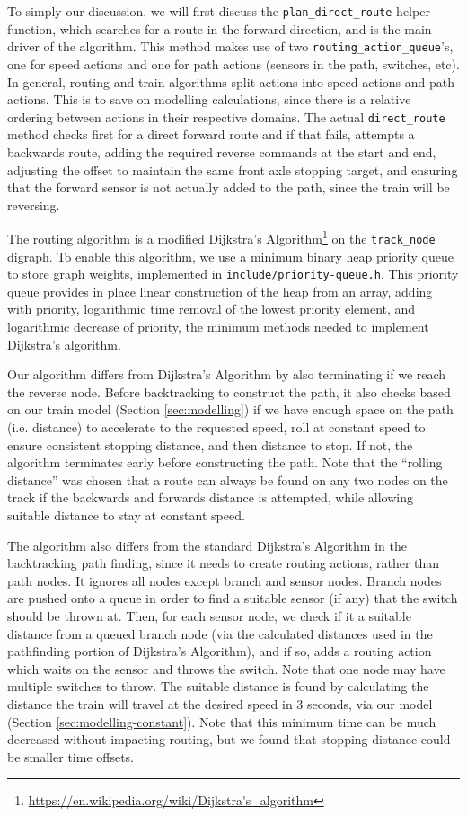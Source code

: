 \documentclass[12pt, titlepage]{article}
\begin{document}
    To simply our discussion, we will first discuss the \verb`plan_direct_route` helper function, which searches for a route in the forward direction, and is the main driver of the algorithm. This method makes use of two \verb`routing_action_queue`'s, one for speed actions and one for path actions (sensors in the path, switches, etc). In general, routing and train algorithms split actions into speed actions and path actions. This is to save on modelling calculations, since there is a relative ordering between actions in their respective domains. The actual \verb`direct_route` method checks first for a direct forward route and if that fails, attempts a backwards route, adding the required reverse commands at the start and end, adjusting the offset to maintain the same front axle stopping target, and ensuring that the forward sensor is not actually added to the path, since the train will be reversing.
    
    The routing algorithm is a modified Dijkstra's Algorithm\footnote{\url{https://en.wikipedia.org/wiki/Dijkstra's_algorithm}} on the \verb`track_node` digraph. To enable this algorithm, we use a minimum binary heap priority queue to store graph weights, implemented in \verb`include/priority-queue.h`. This priority queue provides in place linear construction of the heap from an array, adding with priority, logarithmic time removal of the lowest priority element, and logarithmic decrease of priority, the minimum methods needed to implement Dijkstra's algorithm.
    
    Our algorithm differs from Dijkstra's Algorithm by also terminating if we reach the reverse node. Before backtracking to construct the path, it also checks based on our train model (Section \ref{sec:modelling}) if we have enough space on the path (i.e. distance) to accelerate to the requested speed, roll at constant speed to ensure consistent stopping distance, and then distance to stop. If not, the algorithm terminates early before constructing the path. Note that the ``rolling distance'' was chosen that a route can always be found on any two nodes on the track if the backwards and forwards distance is attempted, while allowing suitable distance to stay at constant speed.
    
    The algorithm also differs from the standard Dijkstra's Algorithm in the backtracking path finding, since it needs to create routing actions, rather than path nodes. It ignores all nodes except branch and sensor nodes. Branch nodes are pushed onto a queue in order to find a suitable sensor (if any) that the switch should be thrown at. Then, for each sensor node, we check if it a suitable distance from a queued branch node (via the calculated distances used in the pathfinding portion of Dijkstra's Algorithm), and if so, adds a routing action which waits on the sensor and throws the switch. Note that one node may have multiple switches to throw. The suitable distance is found by calculating the distance the train will travel at the desired speed in 3 seconds, via our model (Section \ref{sec:modelling-constant}). Note that this minimum time can be much decreased without impacting routing, but we found that stopping distance could be smaller time offsets.
    
\end{document}
